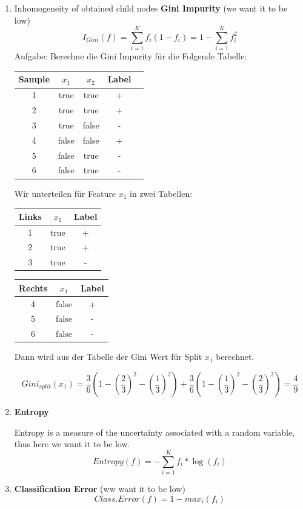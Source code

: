 \documentclass[a4paper]{article}
\begin{document}
\begin{enumerate}
    \item Inhomogeneity of obtained child nodes \textbf{Gini Impurity} (we want it to be low)
    \[
        I_{Gini}(f) = \sum_{i=1}^{K} f_i(1-f_i) = 1 - \sum_{i=1}^{K} f_i^2
    \]
    Aufgabe: Berechne die Gini Impurity für die Folgende Tabelle:

    \begin{center}
        \begin{tabular}{ccccc}
            Sample & $x_1$ & $x_2$ & Label \\
            \hline
            1 & true & true & + \\
            2 & true & true & + \\
            3 & true & false & - \\
            4 & false & false & + \\
            5 & false & true & - \\
            6 & false & true & - \\
        \end{tabular}
    \end{center}

    Wir unterteilen für Feature $x_1$ in zwei Tabellen:

    \begin{center}
        \begin{tabular}{ccc}
            Links & $x_1$ & Label \\
            \hline
            1 & true & + \\
            2 & true & + \\
            3 & true & - \\
        \end{tabular}
        \quad
        \begin{tabular}{ccc}
            Rechts & $x_1$ & Label \\
            \hline
            4 & false & + \\
            5 & false & - \\
            6 & false & - \\
        \end{tabular}
    \end{center}

    Dann wird aus der Tabelle der Gini Wert für Split $x_1$ berechnet.

    \[
        Gini_{split}(x_1) = \frac{3}{6}\left(1-\left(\frac{2}{3}\right)^2-\left(\frac{1}{3}\right)^2\right)
        + \frac{3}{6}\left(1-\left(\frac{1}{3}\right)^2-\left(\frac{2}{3}\right)^2\right)
        = \frac{4}{9}
    \]

    \item \textbf{Entropy}
    
    Entropy is a measure of the uncertainty associated with a random variable, thus here we want it to be low.
    \[
        Entropy(f) = - \sum_{i=1}^{K} f_i*\log(f_i)
    \]
    \item \textbf{Classification Error} (ww want it to be low)
    \[
        Class.Error(f) = 1 - max_i(f_i)
    \]
\end{enumerate}
\end{document}
